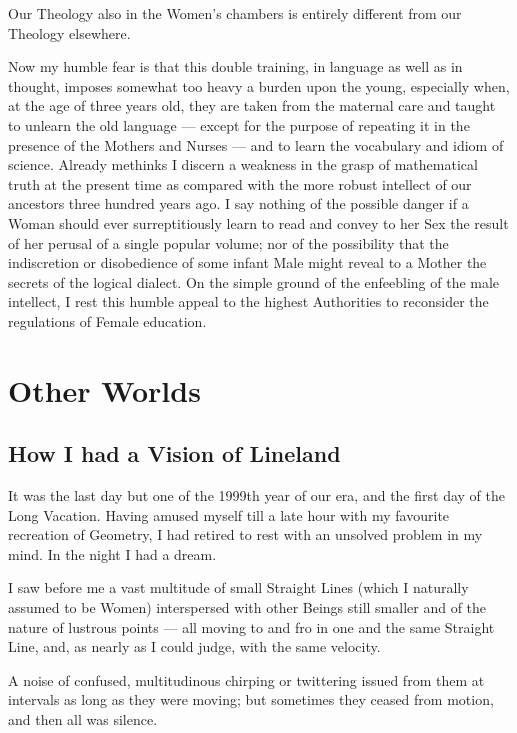 \documentclass[12pt, a4paper, oneside]{memoir}
\begin{document}
Our Theology also in the Women's chambers is entirely different from our
Theology elsewhere.

Now my humble fear is that this double training, in language as well as in
thought, imposes somewhat too heavy a burden upon the young, especially when,
at the age of three years old, they are taken from the maternal care and
taught to unlearn the old language --- except for the purpose of repeating it in
the presence of the Mothers and Nurses --- and to learn the vocabulary and idiom
of science. Already methinks I discern a weakness in the grasp of mathematical
truth at the present time as compared with the more robust intellect of our
ancestors three hundred years ago. I say nothing of the possible danger if a
Woman should ever surreptitiously learn to read and convey to her Sex the
result of her perusal of a single popular volume; nor of the possibility that
the indiscretion or disobedience of some infant Male might reveal to a Mother
the secrets of the logical dialect. On the simple ground of the enfeebling of
the male intellect, I rest this humble appeal to the highest Authorities to
reconsider the regulations of Female education.




\part{Other Worlds}



\chapter{How I had a Vision of Lineland}
It was the last day but one of the 1999th year of our era, and the first day
of the Long Vacation. Having amused myself till a late hour with my favourite
recreation of Geometry, I had retired to rest with an unsolved problem in my
mind. In the night I had a dream.

I saw before me a vast multitude of small Straight Lines (which I naturally
assumed to be Women) interspersed with other Beings still smaller and of the
nature of lustrous points --- all moving to and fro in one and the same Straight
Line, and, as nearly as I could judge, with the same velocity.

A noise of confused, multitudinous chirping or twittering issued from them at
intervals as long as they were moving; but sometimes they ceased from motion,
and then all was silence.
\end{document}
